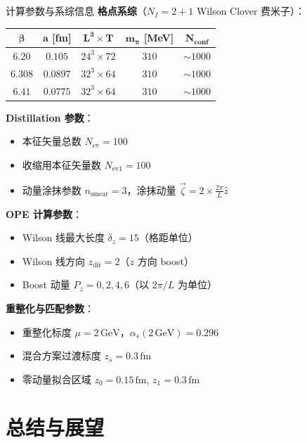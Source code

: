\documentclass[10pt,aspectratio=169]{beamer}
\newcommand{\alphas}{\alpha_s}
\newcommand{\GeV}{\,\mathrm{GeV}}
\newcommand{\fm}{\,\mathrm{fm}}
\newcommand{\Pz}{P_z}
\begin{document}
\begin{frame}{计算参数与系综信息}
\small
\textbf{格点系综}（$N_f = 2+1$ Wilson Clover 费米子）：
\begin{center}
\begin{tabular}{c|c|c|c|c}
  \toprule
  $\bm{\beta}$ & $\bm{a}$ [fm] & $\bm{L^3 \times T}$ & $\bm{m_\pi}$ [MeV] & $\bm{N_{\text{conf}}}$ \\
  \midrule
  $6.20$ & $0.105$ & $24^3 \times 72$ & $310$ & $\sim 1000$ \\
  $6.308$ & $0.0897$ & $32^3 \times 64$ & $310$ & $\sim 1000$ \\
  $6.41$ & $0.0775$ & $32^3 \times 64$ & $310$ & $\sim 1000$ \\
  \bottomrule
\end{tabular}
\end{center}

\textbf{Distillation 参数}：
\begin{itemize}
  \item 本征矢量总数 $N_{\text{ev}} = 100$
  \item 收缩用本征矢量数 $N_{\text{ev1}} = 100$
  \item 动量涂抹参数 $n_{\text{smear}} = 3$，涂抹动量 $\vec{\zeta} = 2 \times \frac{2\pi}{L}\hat{z}$
\end{itemize}

\textbf{OPE 计算参数}：
\begin{itemize}
  \item Wilson 线最大长度 $\delta_z = 15$（格距单位）
  \item Wilson 线方向 $z_{\text{dir}} = 2$（$z$ 方向 boost）
  \item Boost 动量 $\Pz = 0, 2, 4, 6$（以 $2\pi/L$ 为单位）
\end{itemize}

\textbf{重整化与匹配参数}：
\begin{itemize}
  \item 重整化标度 $\mu = 2\GeV$，$\alphas(2\GeV) = 0.296$
  \item 混合方案过渡标度 $z_s = 0.3\fm$
  \item 零动量拟合区域 $z_0 = 0.15\fm$, $z_1 = 0.3\fm$
\end{itemize}
\end{frame}

\section{总结与展望}
\end{document}
